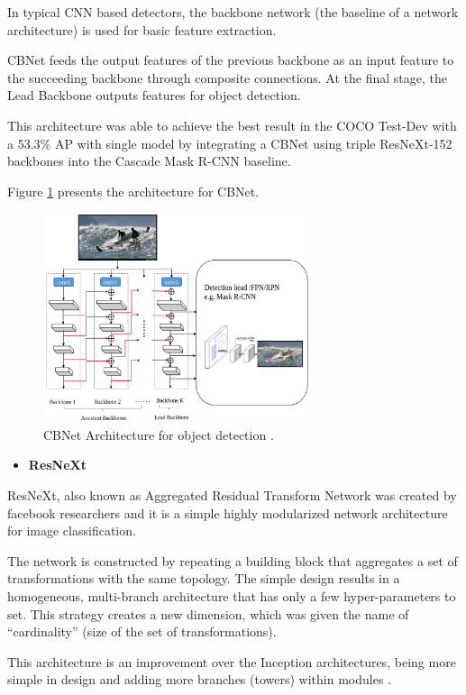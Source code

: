 \par In typical CNN based detectors, the backbone network (the baseline of a network architecture) is used for basic feature extraction.

\par CBNet feeds the output features of the previous backbone as an input feature to the succeeding backbone through composite connections. At the final stage, the Lead Backbone outputs features for object detection.

\par This architecture was able to achieve the best result in the COCO Test-Dev with a 53.3\% AP with single model by integrating a CBNet using triple ResNeXt-152 \cite{Xie2017} backbones into the Cascade Mask R-CNN baseline.


\par Figure \ref{fig:cbnet} presents the architecture for CBNet.



\begin{figure}[H]
    \centering
    \captionsetup{justification=centering}
    \includegraphics[width=0.7\textwidth]{Sections/2StateOfTheArt/2_images/cbnet.png}
    \caption[CBNet Architecture]{CBNet Architecture for object detection \cite{Liu2019}.} 
    \label{fig:cbnet}
\end{figure}


\begin{itemize}
    \item \textbf{ResNeXt}
\end{itemize}

\label{sec:resnext}
\par ResNeXt, also known as Aggregated Residual Transform Network was created by facebook researchers and it is a simple highly modularized network architecture for image classification. 
\par The network is constructed by repeating a building block that aggregates a set of transformations with the same topology. The simple design results in a homogeneous, multi-branch architecture that has only a few hyper-parameters to set. This strategy creates a new dimension, which was given the name of \enquote{cardinality} (size of the set of transformations). 
\par This architecture is an improvement over the Inception architectures, being more simple in design and adding more branches (towers) within modules \cite{Xie2017}.


